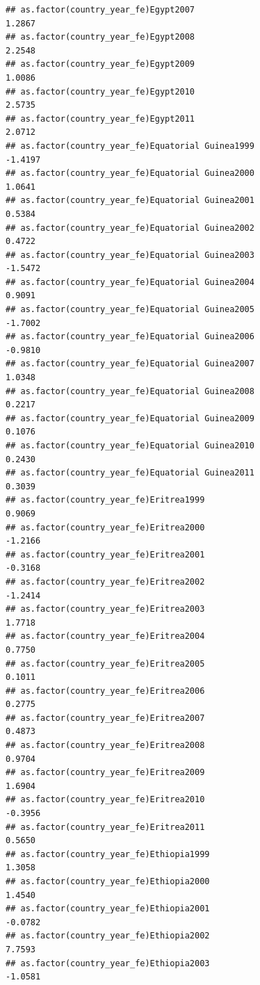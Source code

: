 \documentclass[
  a4paper,
]{article}
\begin{document}
\begin{verbatim}
## as.factor(country_year_fe)Egypt2007                             1.2867
## as.factor(country_year_fe)Egypt2008                             2.2548
## as.factor(country_year_fe)Egypt2009                             1.0086
## as.factor(country_year_fe)Egypt2010                             2.5735
## as.factor(country_year_fe)Egypt2011                             2.0712
## as.factor(country_year_fe)Equatorial Guinea1999                -1.4197
## as.factor(country_year_fe)Equatorial Guinea2000                 1.0641
## as.factor(country_year_fe)Equatorial Guinea2001                 0.5384
## as.factor(country_year_fe)Equatorial Guinea2002                 0.4722
## as.factor(country_year_fe)Equatorial Guinea2003                -1.5472
## as.factor(country_year_fe)Equatorial Guinea2004                 0.9091
## as.factor(country_year_fe)Equatorial Guinea2005                -1.7002
## as.factor(country_year_fe)Equatorial Guinea2006                -0.9810
## as.factor(country_year_fe)Equatorial Guinea2007                 1.0348
## as.factor(country_year_fe)Equatorial Guinea2008                 0.2217
## as.factor(country_year_fe)Equatorial Guinea2009                 0.1076
## as.factor(country_year_fe)Equatorial Guinea2010                 0.2430
## as.factor(country_year_fe)Equatorial Guinea2011                 0.3039
## as.factor(country_year_fe)Eritrea1999                           0.9069
## as.factor(country_year_fe)Eritrea2000                          -1.2166
## as.factor(country_year_fe)Eritrea2001                          -0.3168
## as.factor(country_year_fe)Eritrea2002                          -1.2414
## as.factor(country_year_fe)Eritrea2003                           1.7718
## as.factor(country_year_fe)Eritrea2004                           0.7750
## as.factor(country_year_fe)Eritrea2005                           0.1011
## as.factor(country_year_fe)Eritrea2006                           0.2775
## as.factor(country_year_fe)Eritrea2007                           0.4873
## as.factor(country_year_fe)Eritrea2008                           0.9704
## as.factor(country_year_fe)Eritrea2009                           1.6904
## as.factor(country_year_fe)Eritrea2010                          -0.3956
## as.factor(country_year_fe)Eritrea2011                           0.5650
## as.factor(country_year_fe)Ethiopia1999                          1.3058
## as.factor(country_year_fe)Ethiopia2000                          1.4540
## as.factor(country_year_fe)Ethiopia2001                         -0.0782
## as.factor(country_year_fe)Ethiopia2002                          7.7593
## as.factor(country_year_fe)Ethiopia2003                         -1.0581

\end{verbatim}
\end{document}

